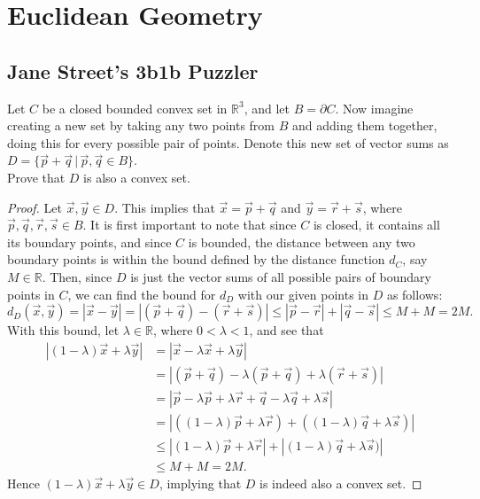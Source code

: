 \documentclass[11pt]{article}
\begin{document}
\pagestyle{fancy}
\fancyhead{}
\tableofcontents
\newpage
\section{Euclidean Geometry}
\subsection{Jane Street's 3b1b Puzzler}
Let $C$ be a closed bounded convex set in $\mathbb{R}^3$, and let $B = \partial C$.
Now imagine creating a new set by taking any two points from $B$ and adding them together, doing this for every possible pair of points.
Denote this new set of vector sums as $D = \{\vec{p}+\vec{q} \, | \,\vec{p},\vec{q} \in B\}$.\\
Prove that $D$ is also a convex set.
\begin{proof}
Let $\vec{x},\vec{y} \in D$. This implies that $\vec{x} = \vec{p} + \vec{q}$ and $\vec{y} = \vec{r} + \vec{s}$,
where $\vec{p},\vec{q},\vec{r},\vec{s} \in B$. It is first important to note that since $C$ is closed, it contains all its boundary points,
and since $C$ is bounded, the distance between any two boundary points is within the bound
defined by the distance function $d_C$, say $M \in \mathbb{R}$. Then, since $D$ is just the vector sums of all possible pairs of boundary points in $C$,
we can find the bound for $d_D$ with our given points in $D$ as follows:
\begin{equation*}
d_D(\vec{x},\vec{y}) = |\vec{x} - \vec{y}| = |(\vec{p} + \vec{q}) - (\vec{r} + \vec{s})| \leq |\vec{p} - \vec{r}| + |\vec{q} - \vec{s}| \leq M + M = 2M.
\end{equation*}
With this bound, let $\lambda \in \mathbb{R}$, where $0 < \lambda < 1$, and see that
\begin{align*}
|(1-\lambda)\vec{x} + \lambda\vec{y}| &= |\vec{x} - \lambda\vec{x} + \lambda\vec{y}| \\
                                      &= |(\vec{p}+\vec{q}) - \lambda(\vec{p}+\vec{q}) + \lambda(\vec{r} + \vec{s})| \\
                                      &= |\vec{p} - \lambda\vec{p} + \lambda\vec{r} + \vec{q} - \lambda\vec{q} + \lambda\vec{s}| \\
                                      &= |((1-\lambda)\vec{p} + \lambda\vec{r}) + ((1-\lambda)\vec{q} + \lambda\vec{s})| \\
                                      & \leq |(1-\lambda)\vec{p} + \lambda\vec{r}| + |(1-\lambda)\vec{q} + \lambda\vec{s})| \\
                                      & \leq M + M = 2M.
\end{align*}
Hence $(1-\lambda)\vec{x} + \lambda\vec{y} \in D$, implying that $D$ is indeed also a convex set.
\end{proof}
\end{document}
